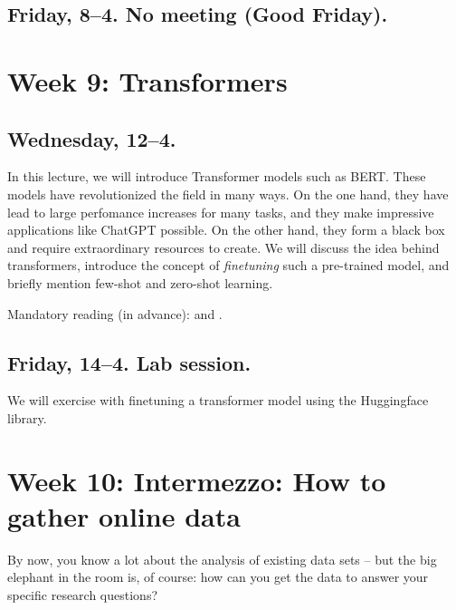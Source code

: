 \subsection*{Friday, 8--4. No meeting (Good Friday).}




\section*{Week 9: Transformers}

\subsection*{Wednesday, 12--4.}
In this lecture, we will introduce Transformer models such as BERT.  These models have revolutionized the field in many ways. On the one hand, they have lead to large perfomance increases for many tasks, and they make impressive applications like ChatGPT possible. On the other hand, they form a black box and require extraordinary resources to create. We will discuss the idea behind transformers, introduce the concept of \emph{finetuning} such a pre-trained model, and briefly mention few-shot and zero-shot learning.

Mandatory reading (in advance): \cite{Lin2023} and \cite{Bender2021}.




\subsection*{Friday, 14--4. Lab session.}

We will exercise with finetuning a transformer model using the Huggingface library.







\section*{Week 10: Intermezzo: How to gather online data}
By now, you know a lot about the analysis of existing data sets -- but the big elephant in the room is, of course: how can you get the data to answer your specific research questions?

